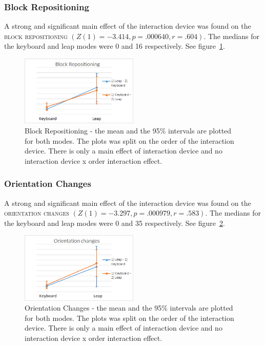 \subsubsection{Block Repositioning}

A strong and significant main effect of the interaction device was found on the \textsc{block repositioning} $(Z(1) = -3.414, p = .000640, r = .604)$. The medians for the keyboard and leap modes were 0 and 16 respectively. See figure~\ref{fig:block_repositioning}.

\begin{figure}[H]
\centering
\includegraphics[width=0.5\textwidth]{imgs/results/block_repositioning}
\caption{Block Repositioning - the mean and the 95\% intervals are plotted for both modes. The plots was split on the order of the interaction device. There is only a main effect of interaction device and no interaction device x order interaction effect.}
\label{fig:block_repositioning}
\end{figure}

\subsubsection{Orientation Changes}

A strong and significant main effect of the interaction device was found on the \textsc{orientation changes} $(Z(1) = -3.297, p = .000979, r = .583)$. The medians for the keyboard and leap modes were 0 and 35 respectively. See figure~\ref{fig:orientation_changes}.

\begin{figure}[H]
\centering
\includegraphics[width=0.5\textwidth]{imgs/results/orientation_changes}
\caption{Orientation Changes - the mean and the 95\% intervals are plotted for both modes. The plots was split on the order of the interaction device. There is only a main effect of interaction device and no interaction device x order interaction effect.}
\label{fig:orientation_changes}
\end{figure}



